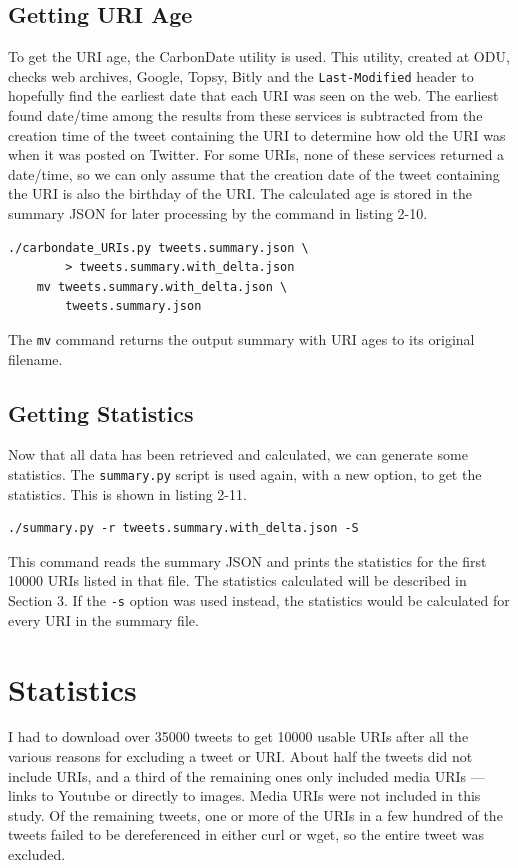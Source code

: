 \documentclass[a4paper,12pt]{article}
\begin{document}
\subsection{Getting URI Age}
To get the URI age, the CarbonDate utility is used. This utility, created at ODU, checks web archives,
Google, Topsy, Bitly and the \texttt{Last-Modified} header to hopefully find the earliest date that
each URI was seen on the web. The earliest found date/time among the results from these services is
subtracted from the creation time of the tweet containing the URI to determine how old the URI was
when it was posted on Twitter. For some URIs, none of these services returned a date/time, so we can
only assume that the creation date of the tweet containing the URI is also the birthday of the URI.
The calculated age is stored in the summary JSON for later processing by the command in listing 2-10.
\begin{lstlisting}[basicstyle=\ttfamily,caption={Getting the URI Age}]
    ./carbondate_URIs.py tweets.summary.json \
        > tweets.summary.with_delta.json
    mv tweets.summary.with_delta.json \
        tweets.summary.json
\end{lstlisting}
The \texttt{mv} command returns the output summary with URI ages to its original filename.

\subsection{Getting Statistics}
Now that all data has been retrieved and calculated, we can generate some statistics. The
\texttt{summary.py} script is used again, with a new option, to get the statistics. This is shown in
listing 2-11.
\begin{lstlisting}[basicstyle=\ttfamily,caption={Generating Statistics}]
    ./summary.py -r tweets.summary.with_delta.json -S
\end{lstlisting}
This command reads the summary JSON and prints the statistics for the first 10000 URIs listed in
that file. The statistics calculated will be described in Section 3. If the \texttt{-s} option was
used instead, the statistics would be calculated for every URI in the summary file.


\section{Statistics}
I had to download over 35000 tweets to get 10000 usable URIs after all the various reasons for
excluding a tweet or URI. About half the tweets did not include URIs, and a third of the remaining ones
only included media URIs --- links to Youtube or directly to images. Media URIs were not included in
this study. Of the remaining tweets, one or more of the URIs in a few hundred of the tweets failed to
be dereferenced in either curl or wget, so the entire tweet was excluded.
\end{document}
